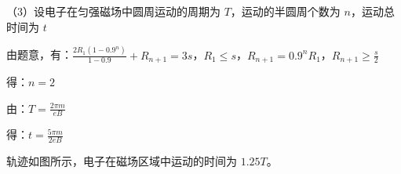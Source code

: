 \documentclass[\gkver]{gaokaozhenti}
\begin{document}
\begin{enumerate}
{（3）设电子在匀强磁场中圆周运动的周期为 $T$，运动的半圆周个数为 $n$，运动总时间为 $t$

由题意，有：$\frac{2R_{1}(1-0.9^{n})}{1-0.9}+R_{n+1}=3s$，$R_{1}\leq s$，$R_{n+1}=0.9^{n}R_{1}$，$R_{n+1}\geq\frac{s}{2}$

得：$n=2$

由：$T=\frac{2\pi m}{eB}$

得：$t=\frac{5\pi m}{2eB}$

轨迹如图所示，电子在磁场区域中运动的时间为 $1.25T$。

}

\end{enumerate}
\end{document}
